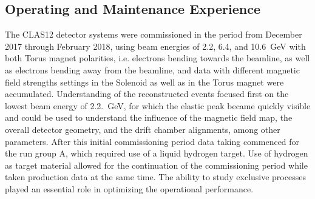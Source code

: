 \documentclass[final,3p,twocolumn]{elsarticle}
\begin{document}
\subsection{Operating and Maintenance Experience}

The CLAS12 detector systems were commissioned in the period from December 2017 through February 2018, using beam
energies of 2.2, 6.4, and 10.6~GeV with both Torus magnet polarities, i.e. electrons bending towards the beamline, as well
as electrons bending away from the beamline, and data with different magnetic field strengths settings in the Solenoid as
well as in the Torus magnet were accumulated. Understanding of the reconstructed events focused first on the lowest beam
energy of 2.2.~GeV, for which the elastic peak became quickly visible and could be used to understand the influence of the
magnetic field map, the overall detector geometry, and the drift chamber alignments, among other parameters. After this
initial commissioning period data taking commenced for the run group A, which required use of a liquid hydrogen target. Use
of hydrogen as target material allowed for the continuation of the commissioning period while taken production data at the
same time. The ability to study exclusive processes played an essential role in optimizing the operational performance. 
\end{document}
